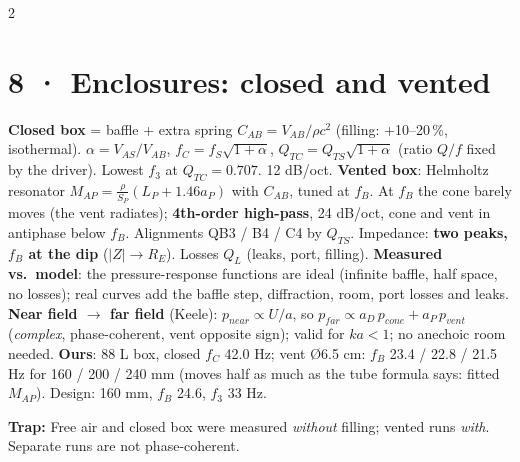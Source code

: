 \documentclass[8pt]{extarticle}
\newcommand{\trap}[1]{\par{\color{tr}\bfseries Trap:} #1\par}
\begin{document}
\begin{multicols}{2}
\section{8 · Enclosures: closed and vented}
\textbf{Closed box} = baffle + extra spring $C_{AB}=V_{AB}/\rho c^2$ (filling: +10–20\,\%, isothermal).
$\alpha=V_{AS}/V_{AB}$, $f_C=f_S\sqrt{1+\alpha}$, $Q_{TC}=Q_{TS}\sqrt{1+\alpha}$ (ratio $Q/f$ fixed by the driver). Lowest $f_3$ at $Q_{TC}=0.707$. 12 dB/oct.
\textbf{Vented box}: Helmholtz resonator $M_{AP}=\frac{\rho}{S_P}(L_P+1.46a_P)$ with $C_{AB}$, tuned at $f_B$. At $f_B$ the cone barely moves (the vent radiates); \textbf{4th-order high-pass}, 24 dB/oct, cone and vent in antiphase below $f_B$. Alignments QB3 / B4 / C4 by $Q_{TS}$. Impedance: \textbf{two peaks, $f_B$ at the dip} ($|Z|\to R_E$). Losses $Q_L$ (leaks, port, filling).
\textbf{Measured vs.\ model}: the pressure-response functions are ideal (infinite baffle, half space, no losses); real curves add the baffle step, diffraction, room, port losses and leaks.
\textbf{Near field $\to$ far field} (Keele): $p_{near}\propto U/a$, so $p_{far}\propto a_D\,p_{cone}+a_P\,p_{vent}$ (\emph{complex}, phase-coherent, vent opposite sign); valid for $ka<1$; no anechoic room needed.
\textbf{Ours}: 88 L box, closed $f_C$ 42.0 Hz; vent Ø6.5 cm: $f_B$ 23.4 / 22.8 / 21.5 Hz for 160 / 200 / 240 mm (moves half as much as the tube formula says: fitted $M_{AP}$). Design: 160 mm, $f_B$ 24.6, $f_3$ 33 Hz.
\trap{Free air and closed box were measured \emph{without} filling; vented runs \emph{with}. Separate runs are not phase-coherent.}


\end{multicols}
\end{document}
